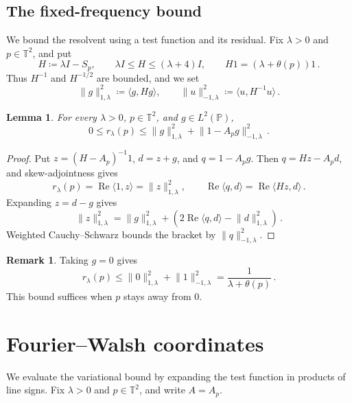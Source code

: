 \documentclass[11pt]{amsart}
\theoremstyle{plain}
\newtheorem{lemma}[theorem]{Lemma}
\theoremstyle{definition}
\newtheorem{remark}[theorem]{Remark}
\newcommand{\T}{\mathbb T}
\renewcommand{\P}{\mathbb P}
\newcommand{\1}{\mathbf 1}
\newcommand{\ip}[2]{\langle #1,#2\rangle}
\newcommand{\norm}[1]{\lVert #1\rVert}
\newcommand{\Hminus}[1]{\norm{#1}_{-1,\lambda}}
\newcommand{\Hplus}[1]{\norm{#1}_{1,\lambda}}
\begin{document}
\subsection{The fixed-frequency bound}\label{ssec:varbound}

We bound the resolvent using a test function and its residual.
Fix $\lambda>0$ and $p\in\T^2$, and put
\begin{equation}\label{eq:H}
  H\coloneqq\lambda I-S_p,\qquad
  \lambda I\leq H\leq(\lambda+4)I,\qquad
  H1=(\lambda+\theta(p))1\, .
\end{equation}
Thus $H^{-1}$ and $H^{-1/2}$ are bounded, and we set
\begin{equation}\label{eq:Hnorms}
  \Hplus g^2\coloneqq\ip g{Hg},\qquad
  \Hminus u^2\coloneqq\ip u{H^{-1}u}\, .
\end{equation}

\begin{lemma}\label{lem:variational-bound}
For every $\lambda>0$, $p\in\T^2$, and $g\in L^2(\P)$,
\begin{equation}\label{eq:var}
  0\leq r_\lambda(p)\leq\Hplus g^2+\Hminus{1-A_pg}^2\, .
\end{equation}
\end{lemma}

\begin{proof}
Put $z=(H-A_p)^{-1}1$, $d=z+g$, and $q=1-A_pg$.  Then
$q=Hz-A_pd$, and skew-adjointness gives
\[
  r_\lambda(p)=\operatorname{Re}\ip1z=\Hplus z^2,
  \qquad
  \operatorname{Re}\ip qd=\operatorname{Re}\ip{Hz}d\, .
\]
Expanding $z=d-g$ gives
\[
  \Hplus z^2=\Hplus g^2
  +\left(2\operatorname{Re}\ip qd-\Hplus d^2\right)\, .
\]
Weighted Cauchy--Schwarz bounds the bracket by $\Hminus q^2$.
\end{proof}

\begin{remark}
Taking $g=0$ gives
\begin{equation}\label{eq:zero-function}
  r_\lambda(p)\leq\Hplus0^2+\Hminus1^2
  =\frac1{\lambda+\theta(p)}\, .
\end{equation}
This bound suffices when $p$ stays away from $0$.
\end{remark}

\section{Fourier--Walsh coordinates}\label{sec:coins}

We evaluate the variational bound by expanding the test function in
products of line signs.  Fix $\lambda>0$ and $p\in\T^2$, and write
$A=A_p$.
\end{document}
